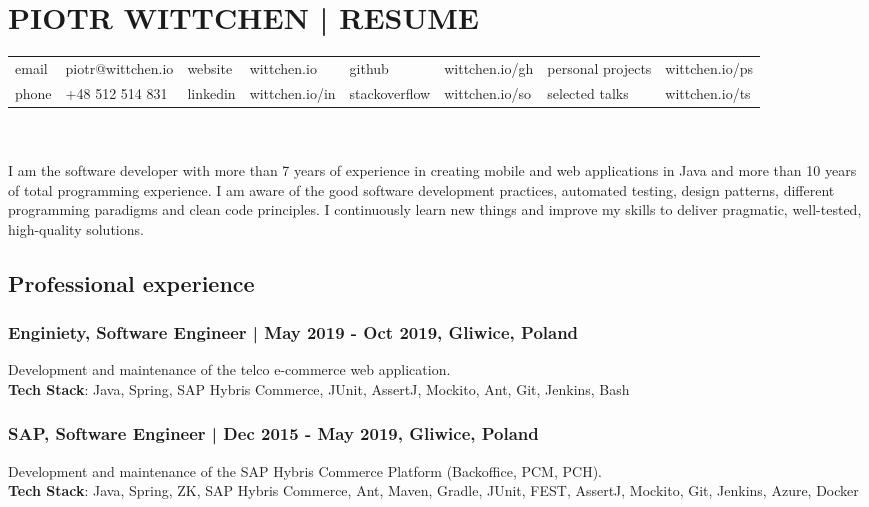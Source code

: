 \documentclass[8pt]{extarticle}
\begin{document}
  \small

  \section*{\large{PIOTR WITTCHEN | RESUME}}

  \begin{tabular}{llllllll}
      email  & piotr@wittchen.io & website  & wittchen.io    & github        & wittchen.io/gh & personal projects & wittchen.io/ps \\
      phone  & +48 512 514 831   & linkedin & wittchen.io/in & stackoverflow & wittchen.io/so & selected talks    & wittchen.io/ts \\
  \end{tabular} \\ \\

    I am the software developer with more than 7 years of experience in creating mobile and web applications in Java and more than 10 years of total programming experience. I am aware of the good software development practices, automated testing, design patterns, different programming paradigms and clean code principles. I continuously learn new things and improve my skills to deliver pragmatic, well-tested, high-quality solutions.

    \subsection*{\normalsize{Professional experience}}

      \subsubsection*{\normalsize{Enginiety, Software Engineer | May 2019 - Oct 2019, Gliwice, Poland}}
      Development and maintenance of the telco e-commerce web application.\\
      \textbf{Tech Stack}: Java, Spring, SAP Hybris Commerce, JUnit, AssertJ, Mockito, Ant, Git, Jenkins, Bash

      \subsubsection*{\normalsize{SAP, Software Engineer | Dec 2015 - May 2019, Gliwice, Poland}}
      Development and maintenance of the SAP Hybris Commerce Platform (Backoffice, PCM, PCH).\\
      \textbf{Tech Stack}: Java, Spring, ZK, SAP Hybris Commerce, Ant, Maven, Gradle,
      JUnit, FEST, AssertJ, Mockito, Git, Jenkins, Azure, Docker
\end{document}
